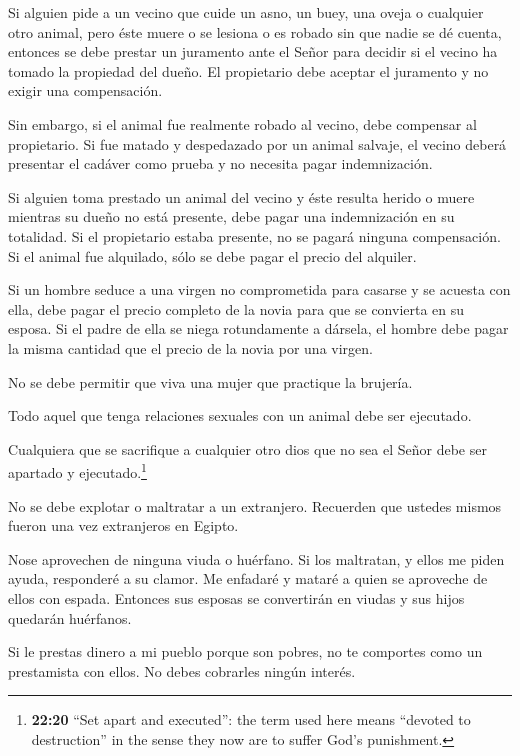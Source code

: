  Si alguien pide a un vecino que cuide un asno, un buey,
una oveja o cualquier otro animal, pero éste muere o se lesiona o es
robado sin que nadie se dé cuenta,  entonces se debe
prestar un juramento ante el Señor para decidir si el vecino ha tomado
la propiedad del dueño. El propietario debe aceptar el juramento y no
exigir una compensación.

 Sin embargo, si el animal fue realmente robado al vecino,
debe compensar al propietario.  Si fue matado y despedazado
por un animal salvaje, el vecino deberá presentar el cadáver como prueba
y no necesita pagar indemnización.

 Si alguien toma prestado un animal del vecino y éste
resulta herido o muere mientras su dueño no está presente, debe pagar
una indemnización en su totalidad.  Si el propietario
estaba presente, no se pagará ninguna compensación. Si el animal fue
alquilado, sólo se debe pagar el precio del alquiler.

 Si un hombre seduce a una virgen no comprometida para
casarse y se acuesta con ella, debe pagar el precio completo de la novia
para que se convierta en su esposa.  Si el padre de ella se
niega rotundamente a dársela, el hombre debe pagar la misma cantidad que
el precio de la novia por una virgen.

 No se debe permitir que viva una mujer que practique la
brujería.

 Todo aquel que tenga relaciones sexuales con un animal
debe ser ejecutado.

 Cualquiera que se sacrifique a cualquier otro dios que no
sea el Señor debe ser apartado y ejecutado.\footnote{\textbf{22:20}
  ``Set apart and executed'': the term used here means ``devoted to
  destruction'' in the sense they now are to suffer God's punishment.}

 No se debe explotar o maltratar a un extranjero. Recuerden
que ustedes mismos fueron una vez extranjeros en Egipto.

 Nose aprovechen de ninguna viuda o huérfano. 
Si los maltratan, y ellos me piden ayuda, responderé a su clamor.
 Me enfadaré y mataré a quien se aproveche de ellos con
espada. Entonces sus esposas se convertirán en viudas y sus hijos
quedarán huérfanos.

 Si le prestas dinero a mi pueblo porque son pobres, no te
comportes como un prestamista con ellos. No debes cobrarles ningún
interés.


